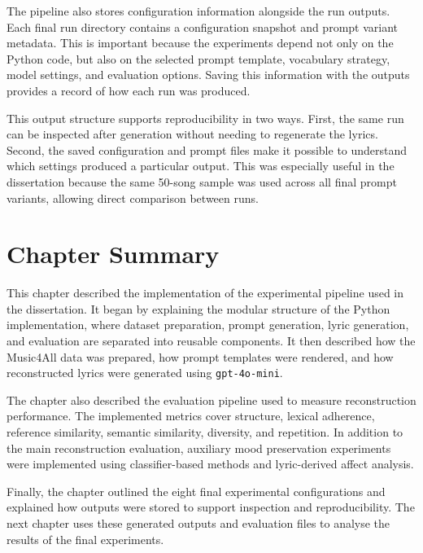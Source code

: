 The pipeline also stores configuration information alongside the run outputs. Each final run directory contains a configuration snapshot and prompt variant metadata. This is important because the experiments depend not only on the Python code, but also on the selected prompt template, vocabulary strategy, model settings, and evaluation options. Saving this information with the outputs provides a record of how each run was produced.

This output structure supports reproducibility in two ways. First, the same run can be inspected after generation without needing to regenerate the lyrics. Second, the saved configuration and prompt files make it possible to understand which settings produced a particular output. This was especially useful in the dissertation because the same 50-song sample was used across all final prompt variants, allowing direct comparison between runs.

\section{Chapter Summary}

This chapter described the implementation of the experimental pipeline used in the dissertation. It began by explaining the modular structure of the Python implementation, where dataset preparation, prompt generation, lyric generation, and evaluation are separated into reusable components. It then described how the Music4All data was prepared, how prompt templates were rendered, and how reconstructed lyrics were generated using \texttt{gpt-4o-mini}.

The chapter also described the evaluation pipeline used to measure reconstruction performance. The implemented metrics cover structure, lexical adherence, reference similarity, semantic similarity, diversity, and repetition. In addition to the main reconstruction evaluation, auxiliary mood preservation experiments were implemented using classifier-based methods and lyric-derived affect analysis.

Finally, the chapter outlined the eight final experimental configurations and explained how outputs were stored to support inspection and reproducibility. The next chapter uses these generated outputs and evaluation files to analyse the results of the final experiments.

